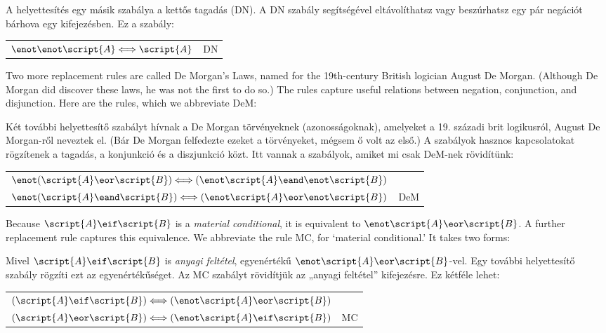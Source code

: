 A helyettesítés egy másik szabálya a kettős tagadás (DN). A DN szabály segítségével eltávolíthatsz vagy beszúrhatsz egy pár negációt bárhova egy kifejezésben. Ez a szabály: 

\begin{center}
\begin{tabular}{rl}
$\enot\enot\script{A} \Longleftrightarrow \script{A}$ & DN
\end{tabular}
\end{center}

Two more replacement rules are called De Morgan's Laws, named for the 19th-century British logician August De Morgan. (Although De Morgan did discover these laws, he was not the first to do so.) The rules capture useful relations between negation, conjunction, and disjunction. Here are the rules, which we abbreviate DeM:

Két további helyettesítő szabályt hívnak a De Morgan törvényeknek (azonosságoknak), amelyeket a 19. századi brit logikusról, August De Morgan-ről neveztek el. (Bár De Morgan felfedezte ezeket a törvényeket, mégsem ő volt az első.) A szabályok hasznos kapcsolatokat rögzítenek a tagadás, a konjunkció és a diszjunkció közt. Itt vannak a szabályok, amiket mi csak DeM-nek rövidítünk:



\begin{center}
\begin{tabular}{rl}
$\enot(\script{A}\eor\script{B}) \Longleftrightarrow (\enot\script{A}\eand\enot\script{B})$\\
$\enot(\script{A}\eand\script{B}) \Longleftrightarrow (\enot\script{A}\eor\enot\script{B})$
& DeM
\end{tabular}
\end{center}

Because $\script{A}\eif\script{B}$ is a \emph{material conditional}, it is equivalent to $\enot\script{A}\eor\script{B}$. A further replacement rule captures this equivalence. We abbreviate the rule MC, for `material conditional.' It takes two forms:

Mivel $\script{A}\eif\script{B}$ is \emph{anyagi feltétel}, egyenértékű $\enot\script{A}\eor\script{B}$-vel. Egy további helyettesítő szabály rögzíti ezt az egyenértékűséget. Az MC szabályt rövidítjük az „anyagi feltétel” kifejezésre. Ez kétféle lehet:

\begin{center}
\begin{tabular}{rl}
$(\script{A}\eif\script{B}) \Longleftrightarrow (\enot\script{A}\eor\script{B})$ &\\
$(\script{A}\eor\script{B}) \Longleftrightarrow (\enot\script{A}\eif\script{B})$ & MC
\end{tabular}
\end{center}

